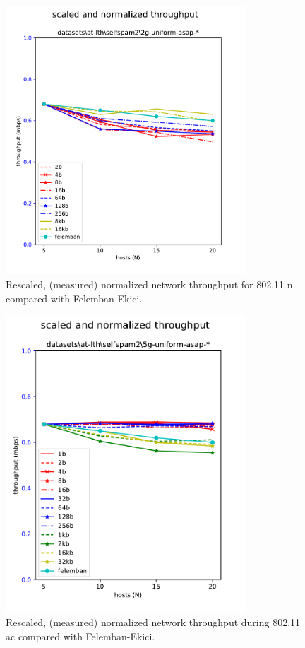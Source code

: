 \begin{figure}[tbp]
  \centering
  \includegraphics[width=0.8\textwidth]{images/rescaled_u_2g.pdf}
  \caption{Rescaled, (measured) normalized network throughput for 802.11 n compared with Felemban-Ekici.}
  \label{fig:rescaled_tput_2g}
\end{figure}

\begin{figure}[tbp]
  \centering
  \includegraphics[width=0.8\textwidth]{images/rescaled_u.pdf}
  \caption{Rescaled, (measured) normalized network throughput during 802.11 ac compared with Felemban-Ekici.}
  \label{fig:rescaled_tput_5g}
\end{figure}

